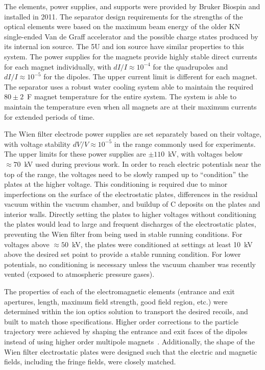 The elements, power supplies, and supports were provided by Bruker
Biospin and installed in 2011. The separator design requirements for the
strengths of the optical elements were based on the maximum beam energy
of the older KN single-ended Van de Graff accelerator and the possible
charge states produced by its internal ion source. The 5U and ion source
have similar properties to this system. The power supplies for the
magnets provide highly stable direct currents for each magnet
individually, with $dI/I \approx 10^{-4}$ for the quadrupoles and $dI/I
\approx 10^{-5}$ for the dipoles. The upper current limit is different
for each magnet. The separator uses a robust water cooling system able
to maintain the required $80\pm2$~\degree{}F magnet temperature for the
entire system. The system is able to maintain the temperature even when
all magnets are at their maximum currents for extended periods of time.

The Wien filter electrode power supplies are set separately based on
their voltage, with voltage stability $dV/V \approx 10^{-5}$ in the
range commonly used for experiments. The upper limits for these power
supplies are $\pm110$~kV, with voltages below $\approx 70$~kV used
during previous work. In order to reach electric potentials near the top
of the range, the voltages need to be slowly ramped up to ``condition''
the plates at the higher voltage. This conditioning is required due to
minor imperfections on the surface of the electrostatic plates,
differences in the residual vacuum within the vacuum chamber, and
buildup of C deposits on the plates and interior walls. Directly setting
the plates to higher voltages without conditioning the plates would lead
to large and frequent discharges of the electrostatic plates, preventing
the Wien filter from being used in stable running conditions. For
voltages above $\approx 50$~kV, the plates were conditioned at settings
at least 10~kV above the desired set point to provide a stable running
condition. For lower potentials, no conditioning is necessary unless the
vacuum chamber was recently vented (exposed to atmospheric pressure
gases).

The properties of each of the electromagnetic elements (entrance and
exit apertures, length, maximum field strength, good field region, etc.)
were determined within the ion optics solution to transport the desired
recoils, and built to match those specifications. Higher order
corrections to the particle trajectory were achieved by shaping the
entrance and exit faces of the dipoles instead of using higher order
multipole magnets~\cite{Couder2008}. Additionally, the shape of the Wien
filter electrostatic plates were designed such that the electric and
magnetic fields, including the fringe fields, were closely matched.


